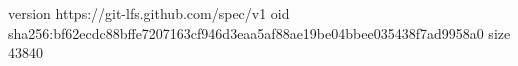version https://git-lfs.github.com/spec/v1
oid sha256:bf62ecdc88bffe7207163cf946d3eaa5af88ae19be04bbee035438f7ad9958a0
size 43840
